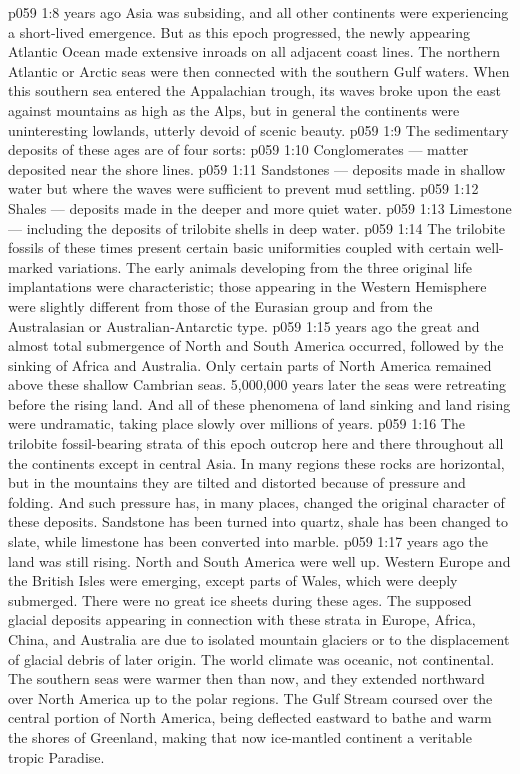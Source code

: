 \vs p059 1:8 \pc {} years ago Asia was subsiding, and all other continents were experiencing a short\hyp{}lived emergence. But as this epoch progressed, the newly appearing Atlantic Ocean made extensive inroads on all adjacent coast lines. The northern Atlantic or Arctic seas were then connected with the southern Gulf waters. When this southern sea entered the Appalachian trough, its waves broke upon the east against mountains as high as the Alps, but in general the continents were uninteresting lowlands, utterly devoid of scenic beauty.
\vs p059 1:9 \pc The sedimentary deposits of these ages are of four sorts:
\vs p059 1:10 \bibnobreakspace Conglomerates --- matter deposited near the shore lines.
\vs p059 1:11 \bibnobreakspace Sandstones --- deposits made in shallow water but where the waves were sufficient to prevent mud settling.
\vs p059 1:12 \bibnobreakspace Shales --- deposits made in the deeper and more quiet water.
\vs p059 1:13 \bibnobreakspace Limestone --- including the deposits of trilobite shells in deep water.
\vs p059 1:14 \pc The trilobite fossils of these times present certain basic uniformities coupled with certain well\hyp{}marked variations. The early animals developing from the three original life implantations were characteristic; those appearing in the Western Hemisphere were slightly different from those of the Eurasian group and from the Australasian or Australian\hyp{}Antarctic type.
\vs p059 1:15 \pc {} years ago the great and almost total submergence of North and South America occurred, followed by the sinking of Africa and Australia. Only certain parts of North America remained above these shallow Cambrian seas. 5,000,000 years later the seas were retreating before the rising land. And all of these phenomena of land sinking and land rising were undramatic, taking place slowly over millions of years.
\vs p059 1:16 The trilobite fossil\hyp{}bearing strata of this epoch outcrop here and there throughout all the continents except in central Asia. In many regions these rocks are horizontal, but in the mountains they are tilted and distorted because of pressure and folding. And such pressure has, in many places, changed the original character of these deposits. Sandstone has been turned into quartz, shale has been changed to slate, while limestone has been converted into marble.
\vs p059 1:17 \pc {} years ago the land was still rising. North and South America were well up. Western Europe and the British Isles were emerging, except parts of Wales, which were deeply submerged. There were no great ice sheets during these ages. The supposed glacial deposits appearing in connection with these strata in Europe, Africa, China, and Australia are due to isolated mountain glaciers or to the displacement of glacial debris of later origin. The world climate was oceanic, not continental. The southern seas were warmer then than now, and they extended northward over North America up to the polar regions. The Gulf Stream coursed over the central portion of North America, being deflected eastward to bathe and warm the shores of Greenland, making that now ice\hyp{}mantled continent a veritable tropic Paradise.
